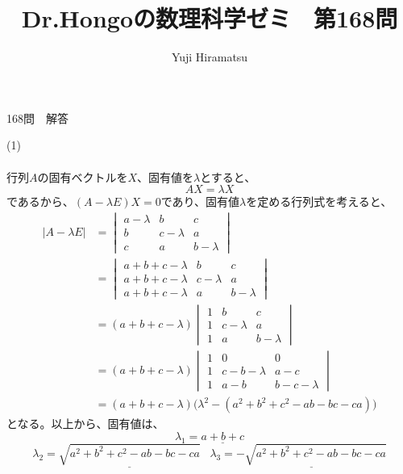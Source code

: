\documentclass[a4j,10pt,oneside,openany]{jsbook}
\title{{\Huge \textbf{Dr.Hongoの数理科学ゼミ　第168問}}\\}
\author{Yuji Hiramatsu}
\date{}
\begin{document}
%
%
\maketitle
%
%


{\Huge 168問　解答}

\vspace{3\baselineskip}


{\Large (1)}
\\
\\
行列$A$の固有ベクトルを$X$、固有値を$\lambda$とすると、
\[ AX=\lambda X \]
であるから、$(A-\lambda E)X=0$であり、固有値$\lambda$を定める行列式を考えると、
\begin{align*}
|A-\lambda E| 	&= \begin{vmatrix} a-\lambda & b & c \\ b & c-\lambda & a \\ c & a & b-\lambda \end{vmatrix} \\[8pt]
			&= \begin{vmatrix} a+b+c-\lambda & b & c \\ a+b+c-\lambda & c-\lambda & a \\ a+b+c-\lambda & a & b-\lambda \end{vmatrix} \\[8pt]
			&= (a+b+c-\lambda) \begin{vmatrix} 1 & b & c \\ 1 & c-\lambda & a \\ 1 & a & b-\lambda \end{vmatrix} \\[8pt]
			&= (a+b+c-\lambda) \begin{vmatrix} 1 & 0 & 0 \\ 1 & c-b-\lambda & a-c \\ 1 & a-b & b-c-\lambda \end{vmatrix} \\[8pt]
			&= (a+b+c-\lambda)\bigl( \lambda^2 - (a^2+b^2+c^2-ab-bc-ca) \bigr)
\end{align*}
となる。以上から、固有値は、
\[ \lambda_{1}=\underline{a+b+c} \]
\[ \lambda_{2}=\underline{\sqrt{a^2+b^2+c^2-ab-bc-ca}} \; \; \; \lambda_{3}=\underline{-\sqrt{a^2+b^2+c^2-ab-bc-ca}} \]
\end{document}
